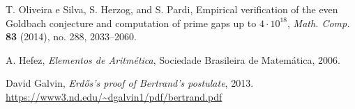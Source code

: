 \documentclass[a4paper,11pt]{article}
\theoremstyle{definition}
\theoremstyle{remark}
\begin{document}
\begin{otherlanguage}{brazil}
\begin{thebibliography}{9}
		T. Oliveira e Silva, S. Herzog, and S. Pardi,
		Empirical verification of the even Goldbach conjecture and computation of prime gaps up to \(4 \cdot 10^{18}\),
		\textit{Math. Comp.} \textbf{83} (2014), no. 288, 2033--2060.
		
		A. Hefez,
		\textit{Elementos de Aritmética},
		Sociedade Brasileira de Matemática, 2006.
		
		David Galvin,
		\textit{Erdős's proof of Bertrand's postulate},
		2013.
		\url{https://www3.nd.edu/~dgalvin1/pdf/bertrand.pdf}
		
		
		
		
		
		
	\end{thebibliography}
    \end{otherlanguage}
	
\end{document}
